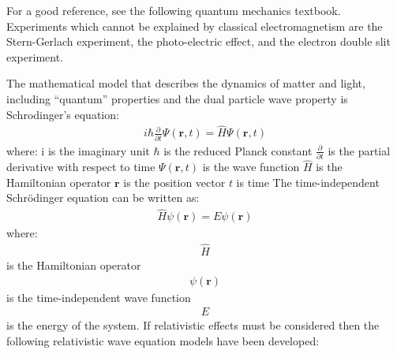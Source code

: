 \documentclass[]{article}
\begin{document}
For a good reference, see the following quantum mechanics 
textbook\cite{sakurai2020modern}.  Experiments which cannot be
explained by classical electromagnetism are the
Stern-Gerlach experiment\cite{gerlach1989experimentelle}, 
the photo-electric effect\cite{wheaton1978philipp}, and
the electron double slit experiment\cite{bach2013controlled}.
\par\noindent
The mathematical model that describes the dynamics of matter and light, including ``quantum'' properties and the dual particle wave property is Schrodinger's equation:
\begin{eqnarray*}
i\hbar \frac{\partial}{\partial t} \Psi(\mathbf{r}, t) = \hat{H} \Psi(\mathbf{r}, t)
\end{eqnarray*}
where:
i is the imaginary unit
$\hbar$ is the reduced Planck constant
$\frac{\partial}{\partial t}$ is the partial derivative with respect to time
$\Psi(\mathbf{r}, t)$ is the wave function
$\hat{H}$ is the Hamiltonian operator
$\mathbf{r}$ is the position vector
$t$ is time
The time-independent Schrödinger equation can be written as:
\begin{eqnarray*}
\hat{H} \psi(\mathbf{r}) = E \psi(\mathbf{r})
\end{eqnarray*}
where:
\begin{eqnarray*}
\hat{H} 
\end{eqnarray*}
is the Hamiltonian operator
\begin{eqnarray*}
\psi(\mathbf{r}) 
\end{eqnarray*}
is the time-independent wave function
\begin{eqnarray*}
E 
\end{eqnarray*}
is the energy of the system.
If relativistic effects must be considered then the following relativistic wave equation models have been developed:
\end{document}

